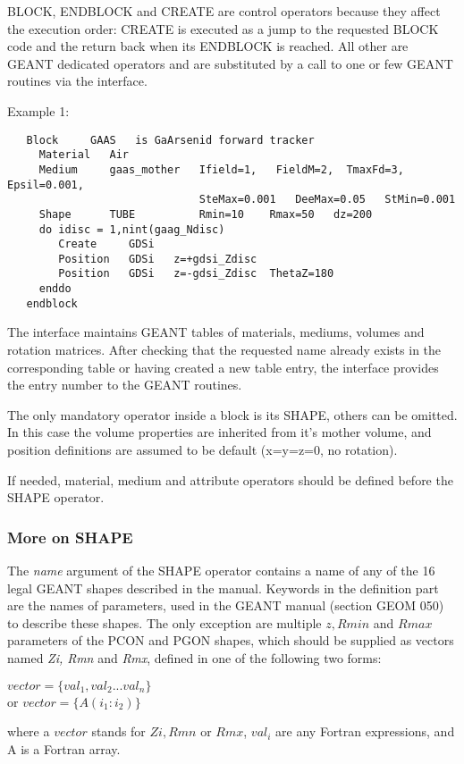 BLOCK, ENDBLOCK and CREATE are control operators because they affect
the execution order:  CREATE is   executed as a jump  to
the requested BLOCK code and the return back when its ENDBLOCK is reached.
All other are GEANT dedicated operators  and   are substituted by a call
to one or few GEANT routines via the \as interface.
  
\vspace{0.5cm}   Example 1:
\begin{verbatim}
   Block     GAAS   is GaArsenid forward tracker
     Material   Air
     Medium     gaas_mother   Ifield=1,   FieldM=2,  TmaxFd=3,   Epsil=0.001,
                              SteMax=0.001   DeeMax=0.05   StMin=0.001
     Shape      TUBE          Rmin=10    Rmax=50   dz=200
     do idisc = 1,nint(gaag_Ndisc)
        Create     GDSi
        Position   GDSi   z=+gdsi_Zdisc
        Position   GDSi   z=-gdsi_Zdisc  ThetaZ=180
     enddo
   endblock
\end{verbatim}
 
 
The \as interface maintains GEANT tables of materials, mediums, volumes
and rotation matrices.
After checking that the requested name already exists
in the corresponding table or having created a new table entry,
the interface provides the entry number to the GEANT routines.
 
 The only mandatory operator inside a block is its SHAPE, 
others can be omitted.  
  In this case the volume properties are inherited from it's mother volume,
  and position definitions are assumed to be default (x=y=z=0, no rotation).

If needed,  material, medium and attribute operators should be defined before the
SHAPE operator.

\subsubsection{More on SHAPE}

 The {\it name} argument of the SHAPE operator contains a name 
of any of the 16 legal GEANT shapes described in the manual.
 Keywords in the definition part are the names of parameters, 
used in the GEANT manual (section GEOM 050) to describe these shapes.
 The only exception are multiple $z,Rmin$ and $Rmax$ parameters 
of the  PCON and PGON shapes, which should be supplied 
as vectors  named  {\it Zi, Rmn } and  {\it Rmx},
defined in one of the following  two forms:
\begin{center}
    \hspace{1.2cm} $vector=\{val_1,val_2 ... val_n\}$ \\
               or  $vector=\{A(i_1:i_2)\}$
\end{center}
where a $vector$ stands for  $Zi, Rmn$  or $Rmx$,
$val_i$ are any Fortran expressions,
and A is a Fortran array.

